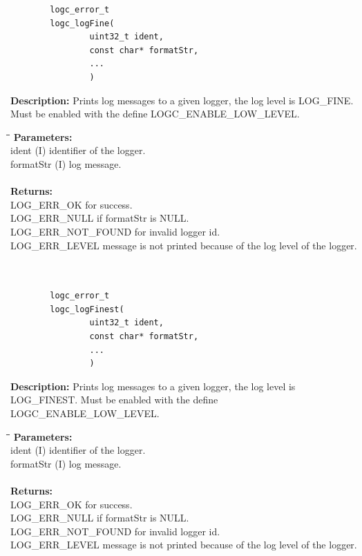 \documentclass[a4paper, titlepage, 11pt]{article}
\begin{document}
\newpage

\small
\begin{verbatim}
        logc_error_t
        logc_logFine(
                uint32_t ident,
                const char* formatStr,
                ...
                )
\end{verbatim}
\normalsize
\textbf{Description:} Prints log messages to a given logger, the log level is LOG\_FINE.
             Must be enabled with the define LOGC\_ENABLE\_LOW\_LEVEL.
\begin{tabbing}
\hspace*{1cm}\=\hspace*{2cm}\=\hspace*{0,6cm}\= \kill
\textbf{Parameters:} \\
\> ident \> (I) identifier of the logger. \\
\> formatStr \> (I) log message. \\ \\
\textbf{Returns:} \\
\> LOG\_ERR\_OK for success. \\
\> LOG\_ERR\_NULL if formatStr is NULL. \\
\> LOG\_ERR\_NOT\_FOUND for invalid logger id. \\
\> LOG\_ERR\_LEVEL message is not printed because of the log level of the logger. \\ \\ \\
\end{tabbing}

\small
\begin{verbatim}
        logc_error_t
        logc_logFinest(
                uint32_t ident,
                const char* formatStr,
                ...
                )
\end{verbatim}
\normalsize
\textbf{Description:} Prints log messages to a given logger, the log level is LOG\_FINEST.
             Must be enabled with the define LOGC\_ENABLE\_LOW\_LEVEL.
\begin{tabbing}
\hspace*{1cm}\=\hspace*{2cm}\=\hspace*{0,6cm}\= \kill
\textbf{Parameters:} \\
\> ident \> (I) identifier of the logger. \\
\> formatStr \> (I) log message. \\ \\
\textbf{Returns:} \\
\> LOG\_ERR\_OK for success. \\
\> LOG\_ERR\_NULL if formatStr is NULL. \\
\> LOG\_ERR\_NOT\_FOUND for invalid logger id. \\
\> LOG\_ERR\_LEVEL message is not printed because of the log level of the logger. \\
\end{tabbing}
\end{document}
